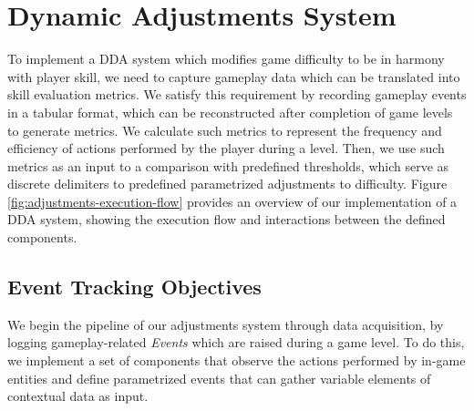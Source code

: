 


\section{Dynamic Adjustments System}

To implement a DDA system which modifies game difficulty to be in harmony with player skill, we need to capture gameplay data which can be translated into skill evaluation metrics. We satisfy this requirement by recording gameplay events in a tabular format, which can be reconstructed after completion of game levels to generate metrics. We calculate such metrics to represent the frequency and efficiency of actions performed by the player during a level. Then, we use such metrics as an input to a comparison with predefined thresholds, which serve as discrete delimiters to predefined parametrized adjustments to difficulty. Figure \ref{fig:adjustments-execution-flow} provides an overview of our implementation of a DDA system, showing the execution flow and interactions between the defined components.



\subsection{Event Tracking Objectives}

We begin the pipeline of our adjustments system through data acquisition, by logging gameplay-related \emph{Events} which are raised during a game level. To do this, we implement a set of components that observe the actions performed by in-game entities and define parametrized events that can gather variable elements of contextual data as input.

